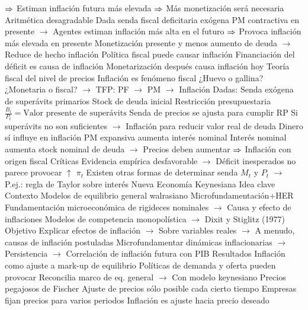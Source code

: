 \documentclass{nuevotema}
\begin{document}
\begin{esquemal}
				\4[] $\then$ Estiman inflación futura más elevada
				\4[] $\then$ Más monetización será necesaria
				\4 Aritmética desagradable
				\4[] Dada senda fiscal deficitaria exógena
				\4[] PM contractiva en presente
				\4[] $\to$ Agentes estiman inflación más alta en el futuro
				\4[] $\then$ Provoca inflación más elevada en presente
				\4[] Monetización presente y menos aumento de deuda
				\4[] $\to$ Reduce de hecho inflación
				\4[$\then$] Política fiscal puede causar inflación
				\4[$\then$] Financiación del déficit es causa de inflación
				\4[$\then$] Monetarización después causa inflación hoy
			\3 Teoría fiscal del nivel de precios
				\4 Inflación es fenómeno fiscal
				\4[] ¿Huevo o gallina?
				\4[] ¿Monetaria o fiscal?
				\4[] $\to$ TFP: PF $\to$ PM $\to$ Inflación
				\4 Dadas:
				\4[] Senda exógena de superávits primarios
				\4[] Stock de deuda inicial
				\4 Restricción presupuestaria
				\4[] $\frac{B_t}{P_t} = \text{Valor presente de superávits}$
				\4 Senda de precios se ajusta para cumplir RP
				\4[] Si superávits no son suficientes
				\4[] $\to$ Inflación para reducir valor real de deuda
				\4 Dinero sí influye en inflación
				\4[] PM expansiva aumenta interés nominal
				\4[] Interés nominal aumenta stock nominal de deuda
				\4[] $\to$ Precios deben aumentar
				\4[] $\then$ Inflación con origen fiscal
				\4 Críticas
				\4[] Evidencia empírica desfavorable
				\4[] $\to$ Déficit inesperados no parece provocar $\uparrow$ $\pi_t$
				\4[] Existen otras formas de determinar senda $M_t$ y $P_t$
				\4[] $\to$ P.ej.: regla de Taylor sobre interés
		\2 Nueva Economía Keynesiana
			\3 Idea clave
				\4 Contexto
				\4[] Modelos de equilibrio general walrasiano
				\4[] Microfundamentación+HER
				\4[] Fundamentación microeconómica de rigideces nominales
				\4[] $\to$ Causa y efecto de inflaciones
				\4[] Modelos de competencia monopolística
				\4[] $\to$ Dixit y Stiglitz (1977)
				\4 Objetivo
				\4[] Explicar efectos de inflación
				\4[] $\to$ Sobre variables reales
				\4[] $\to$ A menudo, causas de inflación postuladas
				\4[] Microfundamentar dinámicas inflacionarias
				\4[] $\to$ Persistencia
				\4[] $\to$ Correlación de inflación futura con PIB
				\4 Resultados
				\4[] Inflación como ajuste a mark-up de equilibrio
				\4[] Políticas de demanda y oferta pueden provocar
				\4[] Reconcilia marco de eq. general
				\4[] $\to$ Con modelo keynesiano
			\3 Precios pegajosos de Fischer
				\4 Ajuste de precios sólo posible cada cierto tiempo
				\4 Empresas fijan precios para varios periodos
				\4 Inflación es ajuste hacia precio deseado

\end{esquemal}
\end{document}
